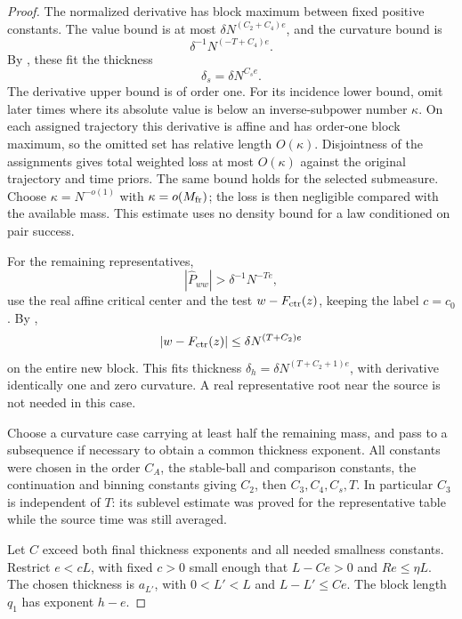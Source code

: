 \begin{proof}
The normalized derivative has block maximum between fixed positive
constants.  The value bound is at most
\(\delta N^{(C_2+C_4)e}\), and the curvature bound is
\[
 \delta^{-1}N^{(-T+C_4)e}.
\]
By , these fit the thickness
\[
 \delta_s=\delta N^{C_s e}.
\]
The derivative upper bound is of order one.  For its incidence
lower bound, omit later times where its absolute value is below
an inverse-subpower number \(\kappa\).  On each assigned
trajectory this derivative is affine and has order-one block
maximum, so the omitted set has relative length \(O(\kappa)\).
Disjointness of the assignments gives total weighted loss at most
\(O(\kappa)\) against the original trajectory and time priors.
The same bound holds for the selected submeasure.  Choose
\(\kappa=N^{-o(1)}\) with \(\kappa=o(M_{\rm fr})\); the loss is
then negligible compared with the available mass.  This estimate
uses no density bound for a law conditioned on pair success.

For the remaining representatives,
\[
 |\widehat P_{ww}|>\delta^{-1}N^{-Te},
\]
use the real affine critical center and the test
\(w-F_{\rm ctr}(z)\), keeping the label \(c=c_0\).
By ,
\[
 |w-F_{\rm ctr}(z)|\le\delta N^{(T+C_2)e}
\]
on the entire new block.  This fits thickness
\(\delta_h=\delta N^{(T+C_2+1)e}\), with derivative identically
one and zero curvature.  A real representative root near the
source is not needed in this case.

Choose a curvature case carrying at least half the remaining
mass, and pass to a subsequence if necessary to obtain a common
thickness exponent.  All constants were chosen in the order
\(C_A\), the stable-ball and comparison constants, the continuation
and binning constants giving \(C_2\), then \(C_3,C_4,C_s,T\).
In particular \(C_3\) is independent of \(T\): its sublevel
estimate was proved for the representative table while the source
time was still averaged.

Let \(C\) exceed both final thickness exponents and all needed
smallness constants.  Restrict \(e<cL\), with fixed \(c>0\) small
enough that \(L-Ce>0\) and \(Re\le\eta L\).  The chosen thickness
is \(a_{L'}\), with \(0<L'<L\) and \(L-L'\le Ce\).
The block length \(q_1\) has exponent \(h-e\).


\end{proof}
